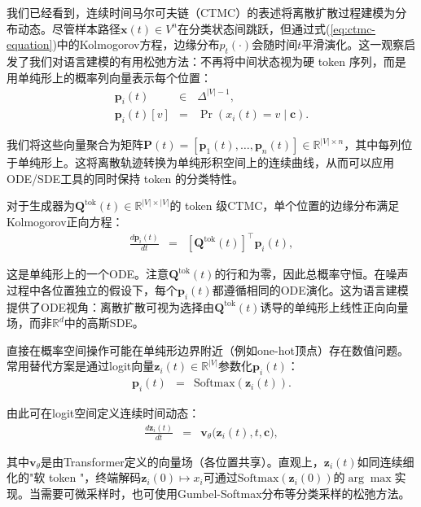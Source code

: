 \documentclass[UTF8,a4paper,zihao=-4,oneside,openany]{ctexbook}
\begin{document}
我们已经看到，连续时间马尔可夫链（CTMC）的表述将离散扩散过程建模为分布动态。尽管样本路径$\mathbf{x}(t)\in V^n$在分类状态间跳跃，但通过式(\ref{eq:ctmc-equation})中的Kolmogorov方程，边缘分布$p_t(\cdot)$会随时间$t$平滑演化。这一观察启发了我们对语言建模的有用松弛方法：不再将中间状态视为硬 token 序列，而是用单纯形上的概率列向量表示每个位置：
\begin{eqnarray}
\mathbf{p}_i(t) & \in & \Delta^{|V|-1}, \\
\mathbf{p}_i(t)[v] & = & \Pr(x_i(t)=v \mid \mathbf{c}).
\end{eqnarray}

\noindent 我们将这些向量聚合为矩阵$\mathbf{P}(t) = [\mathbf{p}_1(t), \dots, \mathbf{p}_n(t)] \in \mathbb{R}^{|V| \times n}$，其中每列位于单纯形上。这将离散轨迹转换为单纯形积空间上的连续曲线，从而可以应用ODE/SDE工具的同时保持 token 的分类特性。

对于生成器为$\mathbf{Q}^{\mathrm{tok}}(t) \in \mathbb{R}^{|V| \times |V|}$的 token 级CTMC，单个位置的边缘分布满足Kolmogorov正向方程：
\begin{eqnarray}
\frac{d \mathbf{p}_i(t)}{dt} & = & \left[ \mathbf{Q}^{\mathrm{tok}}(t) \right]^\top \mathbf{p}_i(t),
\label{eq:simplex-forward-ode}
\end{eqnarray}

\noindent 这是单纯形上的一个ODE。注意$\mathbf{Q}^{\mathrm{tok}}(t)$的行和为零，因此总概率守恒。在噪声过程中各位置独立的假设下，每个$\mathbf{p}_i(t)$都遵循相同的ODE演化。这为语言建模提供了ODE视角：离散扩散可视为选择由$\mathbf{Q}^{\mathrm{tok}}(t)$诱导的单纯形上线性正向向量场，而非$\mathbb{R}^d$中的高斯SDE。

直接在概率空间操作可能在单纯形边界附近（例如one-hot顶点）存在数值问题。常用替代方案是通过logit向量$\mathbf{z}_i(t)\in\mathbb{R}^{|V|}$参数化$\mathbf{p}_i(t)$：
\begin{eqnarray}
\mathbf{p}_i(t) & = &\mathrm{Softmax}(\mathbf{z}_i(t)).
\end{eqnarray}

\noindent 由此可在logit空间定义连续时间动态：
\begin{eqnarray}
\frac{d \mathbf{z}_i(t)}{dt} & = & \mathbf{v}_{\theta} \big(\mathbf{z}_i(t),t,\mathbf{c}\big),
\label{eq:logit-ode}
\end{eqnarray}

\noindent 其中$\mathbf{v}_{\theta}$是由Transformer定义的向量场（各位置共享）。直观上，$\mathbf{z}_i(t)$如同连续细化的"软 token "，终端解码$\mathbf{z}_i(0)\mapsto x_i$可通过$\mathrm{Softmax}(\mathbf{z}_i(0))$的$\arg\max$实现。当需要可微采样时，也可使用Gumbel-Softmax分布等分类采样的松弛方法\citep{jang-etal:2017categorical,maddison-etal:2017the}。
\end{document}
